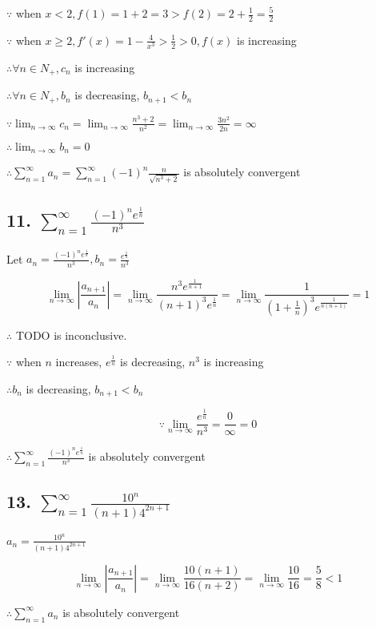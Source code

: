 \documentclass{article}
\begin{document}
    $\because$ when $x < 2, f(1) = 1 + 2 = 3 > f(2) = 2 + \frac 1 2 = \frac 5 2$

    $\because$ when $x \geq 2, f'(x) = 1 - \frac{4}{x^3} > \frac{1}{2} > 0, f(x)$ is increasing

    $\therefore \forall n \in N_+, c_n$ is increasing

    $\therefore \forall n \in N_+, b_n$ is decreasing, $b_{n+1} < b_n$

    $\because \lim_{n\to\infty} c_n = \lim_{n\to\infty}\frac{n^3+2}{n^2} = \lim_{n\to\infty}\frac{3n^2}{2n} = \infty$

    $\therefore \lim_{n\to\infty} b_n = 0$

    $\therefore \sum_{n=1}^\infty a_n = \sum_{n=1}^\infty (-1)^n \frac{n}{\sqrt{n^3 + 2}}$ is absolutely convergent

    \subsection*{11. $\sum_{n=1}^\infty \frac{(-1)^n e^{\frac 1 n}}{n^3}$}

    Let $a_n = \frac{(-1)^n e^{\frac 1 n}}{n^3}, b_n = \frac{e^{\frac 1 n}}{n^3}$

    $$\lim_{n\to\infty}|\frac{a_{n+1}}{a_n}| = \lim_{n\to\infty}\frac{n^3 e^{\frac{1}{n+1}}}{(n+1)^3 e^{\frac{1}{n}}} = \lim_{n\to\infty}\frac{1}{(1+\frac 1 n)^3 e^{\frac{1}{n(n+1)}}} = 1$$

    $\therefore$ TODO is inconclusive.

    $\because$ when $n$ increases, $e^{\frac 1 n}$ is decreasing, $n^3$ is increasing

    $\therefore b_n$ is decreasing, $b_{n+1} < b_n$

    $$\because \lim_{n\to\infty}\frac{e^{\frac 1 n}}{n^3} = \frac{0}{\infty} = 0$$

    $\therefore \sum_{n=1}^\infty \frac{(-1)^n e^{\frac 1 n}}{n^3}$ is absolutely convergent


    \subsection*{13. $\sum_{n=1}^\infty \frac{10^n}{(n+1)4^{2n+1}}$}

    $a_n = \frac{10^n}{(n+1)4^{2n+1}}$

    $$\lim_{n\to\infty}|\frac{a_{n+1}}{a_n}| = \lim_{n\to\infty} \frac{10(n+1)}{16(n+2)} = \lim_{n\to\infty}\frac{10}{16} = \frac 5 8 < 1$$

    $\therefore \sum_{n=1}^\infty a_n$ is absolutely convergent
\end{document}
